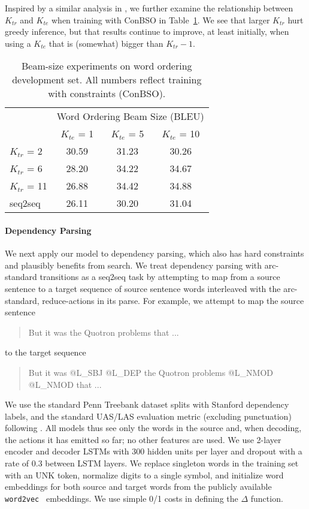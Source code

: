 \documentclass[11pt,letterpaper]{article}
\begin{document}
Inspired by a similar analysis in , we further examine the relationship between $K_{tr}$ and $K_{te}$ when training with ConBSO in Table~\ref{tab:wosizeexp}. We see that larger $K_{tr}$ hurt greedy inference, but that results continue to improve, at least initially, when using a $K_{te}$ that is (somewhat) bigger than $K_{tr}-1$.
\begin{table}
  \centering
  \begin{tabular}{lccc}
    \toprule
    & \multicolumn{3}{c}{Word Ordering Beam Size (BLEU) } \\ 
    &  $K_{te}$ = 1 & $K_{te}$ = 5 & $K_{te}$ = 10 \\ 
    \midrule
    $K_{tr}$ = 2 & 30.59 & 31.23 & 30.26 \\
    $K_{tr}$ = 6 & 28.20 & 34.22 & 34.67 \\
    $K_{tr}$ = 11 & 26.88 & 34.42 & 34.88 \\   
    \midrule
    seq2seq & 26.11 & 30.20 & 31.04 \\         
    \bottomrule
  \end{tabular}
  \caption{Beam-size experiments on word ordering development set. All numbers reflect training with constraints (ConBSO).}
  \label{tab:wosizeexp}
\end{table}



\paragraph{Dependency Parsing}
We next apply our model to dependency parsing, which also has hard constraints and plausibly benefits from search. We treat dependency parsing with arc-standard transitions as a seq2seq task by attempting to map from a source sentence to a target sequence of source sentence words interleaved with the arc-standard, reduce-actions in its parse. For example, we attempt to map the source sentence \begin{quote}
But it was the Quotron problems that  ...
\end{quote} to the target sequence \begin{quote}
But it was @L\_SBJ @L\_DEP the Quotron problems @L\_NMOD @L\_NMOD that ...
\end{quote}
We use the standard Penn Treebank dataset splits with Stanford dependency labels, and the standard UAS/LAS evaluation metric (excluding punctuation) following  . All models thus see only the words in the source and, when decoding, the actions it has emitted so far; no other features are used. We use 2-layer encoder and decoder LSTMs with 300 hidden units per layer and dropout with a rate of 0.3 between LSTM layers. We replace singleton words in the training set with an UNK token, normalize digits to a single symbol, and initialize word embeddings for both source and target words from the publicly available \texttt{word2vec}~\cite{mikolov2013distributed} embeddings. We use simple 0/1 costs in defining the $\Delta$ function. 
\end{document}
